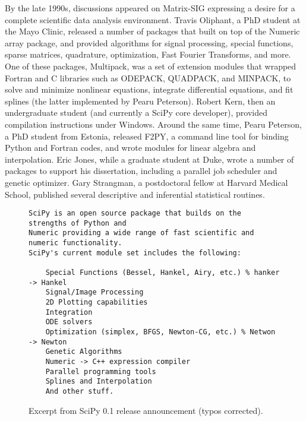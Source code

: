\documentclass[fleqn,10pt]{wlscirep}
\begin{document}
By the late 1990s, discussions appeared on Matrix-SIG
expressing a desire for a complete scientific data analysis environment\cite{Travis-Keynote-2010}.
Travis Oliphant, a PhD student at the Mayo Clinic,
released a number of packages\cite{Travis-some-modules,Travis-enhance}
that built on top of the Numeric array
package, and provided algorithms for signal processing, special
functions, sparse matrices, quadrature, optimization, Fast Fourier
Transforms, and more.  One of these packages, Multipack\cite{multipack}, was a set of
extension modules that wrapped Fortran and C libraries such as
ODEPACK\cite{hindmarsh1983odepack}, QUADPACK\cite{piessens1983quadpack}, and MINPACK\cite{osti_6997568}, to solve and minimize nonlinear
equations, integrate differential equations, and fit splines (the
latter implemented by Pearu Peterson).  Robert Kern, then an
undergraduate student (and currently a SciPy core developer), provided
compilation instructions under Windows.
Around the same time, Pearu Peterson, a PhD student from Estonia,
released F2PY\cite{peterson2009f2py}, a command line tool for binding Python and Fortran
codes, and wrote modules for linear algebra and interpolation.
Eric Jones, while a graduate student at Duke, wrote a number of
packages to support his dissertation, including a parallel job
scheduler and genetic optimizer.
%
%
Gary Strangman, a postdoctoral fellow at Harvard Medical School,
published several descriptive and inferential statistical
routines\cite{Strangman-modules}.

\begin{figure}
\begin{verbatim}
SciPy is an open source package that builds on the strengths of Python and
Numeric providing a wide range of fast scientific and numeric functionality.
SciPy's current module set includes the following:

    Special Functions (Bessel, Hankel, Airy, etc.) % hanker -> Hankel
    Signal/Image Processing
    2D Plotting capabilities
    Integration
    ODE solvers
    Optimization (simplex, BFGS, Newton-CG, etc.) % Netwon -> Newton
    Genetic Algorithms
    Numeric -> C++ expression compiler
    Parallel programming tools
    Splines and Interpolation
    And other stuff.
\end{verbatim}
\caption{Excerpt from SciPy 0.1 release announcement (typos corrected).}\label{fig:announce-0.1}
\end{figure}
\end{document}
